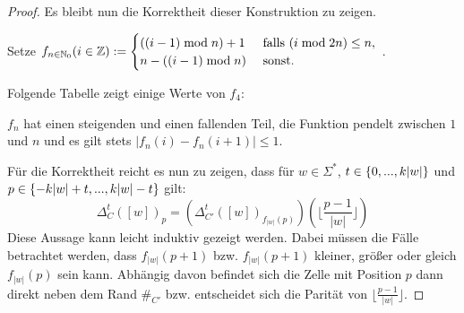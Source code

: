 \begin{proof}
    Es bleibt nun die Korrektheit dieser Konstruktion zu zeigen.
    
    Setze $f_{n \in \mathbb{N}_0}(i \in \mathbb{Z}) :=
    \begin{cases} 
        ((i - 1) \; \mathrm{mod} \; n) + 1  & \textrm{ falls } (i \; \mathrm{mod} \; 2n) \leq n, \\
        n - ((i - 1) \; \mathrm{mod} \; n)  & \textrm{ sonst.}
    \end{cases}$
    .
    \newline
    
    Folgende Tabelle zeigt einige Werte von $f_4$:
    \begin{center}
    \end{center}
    
    $f_n$ hat einen steigenden und einen fallenden Teil, die Funktion pendelt zwischen $1$ und $n$
    und es gilt stets $|f_n(i) - f_n(i+1)| \leq 1$.
    
    Für die Korrektheit reicht es nun zu zeigen, dass für $w \in \Sigma^*$, $t \in \{ {0, ..., k|w|} \}$ und $p \in \{ {-k|w|+t, ..., k|w|-t} \}$ gilt:
    \[
        \Delta_C^t([w])_p
            = (\Delta_{C'}^t([w])_{f_{|w|}(p)})(\lfloor \frac{p - 1}{|w|} \rfloor)
    \]
    Diese Aussage kann leicht induktiv gezeigt werden.
    Dabei müssen die Fälle betrachtet werden,
    dass $f_{|w|}(p+1)$ \acs{bzw.} $f_{|w|}(p+1)$
    kleiner, größer oder gleich $f_{|w|}(p)$ sein kann.
    Abhängig davon befindet sich die Zelle mit Position $p$ dann direkt neben dem Rand $\#_{C'}$ \acs{bzw.}
    entscheidet sich die Parität von $\lfloor \frac{p - 1}{|w|} \rfloor$.
    
    \begin{comment}
    $P_{t \in \Nz, n \in \N} := \finset{-kn+t, ..., kn-t}$.
    
        Sei $w \in \Sigma^*$.
        Beweis der Behauptung durch Induktion über $t$.

        Sei $t = 0$, $p \in \finset{1, ..., |w|}$.
        Dann $\Delta_{C'}^0([w])_p = w_p
        = \phi(w_p)(0)
        = (\Delta_{C'}^t([w])_{p})(0)
        = (\Delta_{C'}^t([w])_{f_{|w|}(p)})(\lfloor \frac{p - 1}{|w|} \rfloor)$.
        Sei nun $p \in P_{0,|w|} \setminus \finset{1, ..., |w|}$.
        Dann $\lfloor \frac{p - 1}{|w|} \rfloor \in K \setminus \finset{0}$ und
        $\Delta_{C'}^0([w])_p = \#_C =
        (\Delta_{C'}^t([w])_{f_{|w|}(p)})(\lfloor \frac{p - 1}{|w|} \rfloor)$.
    
    
        Sei $1 \leq t \leq k|w|$.
        Dann gilt das auch, ist aber mühselig. Am liebsten
        würde ich ja einen formalen, Computer-gestützten Beweis führen...
    \end{comment}
\end{proof}

